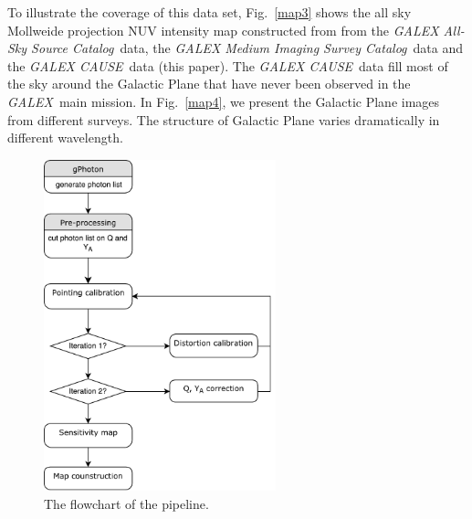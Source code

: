 \documentclass[12pt, preprint]{aastex}
\newcommand{\project}[1]{\textsl{#1}}
\newcommand{\galex}{\project{GALEX}}
\newcommand{\asc}{\project{GALEX All-Sky Source Catalog}}
\newcommand{\msc}{\project{GALEX Medium Imaging Survey Catalog}}
\newcommand{\cause}{\project{GALEX CAUSE}}
\begin{document}
To illustrate the coverage of this data set, Fig.~\ref{map3} shows the all sky Mollweide projection NUV intensity map constructed from from the \asc\ data, the \msc\ data and the \cause\ data (this paper).
The \cause\ data fill most of the sky around the Galactic Plane that have never been observed in the \galex\ main mission.
In Fig.~\ref{map4}, we present the Galactic Plane images from different surveys. 
The structure of Galactic Plane varies dramatically in different wavelength.
\begin{figure}[p]
\begin{center}
\includegraphics[width=0.6\textwidth]{figures/flowchart}
\end{center}
\caption{
  \label{flowchart}
  The flowchart of the pipeline.
}
\end{figure}
\end{document}

